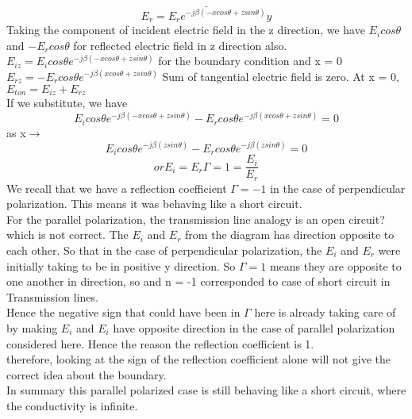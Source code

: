 \begin{equation*}
\bar{E_{r} = E_{r} e^{-j\beta(-xcos\theta + zsin\theta)} \hat{y}}
\end{equation*}
Taking the component of incident electric field in the z direction, we have $E_{i} cos\theta$ and $-E_{r}cos\theta$ for reflected electric field in z direction also.
$E_{iz} = E_{i}cos\theta e^{-j\beta(-xcos\theta + zsin\theta)}$	for the boundary condition and x = 0
$E_{rz} = -E_{r}cos\theta e^{-j\beta(xcos\theta + zsin\theta)}$   Sum of tangential electric field is zero.
At x = 0, $E_{ton} = E_{iz} + E_{rz}$\\
If we substitute, we have\\
\begin{equation*}
E_{i}cos\theta e^{-j\beta(-xcos\theta + zsin\theta)} - E_{r}cos\theta e^{-j\beta(xcos\theta + zsin\theta)} = 0
\end{equation*}
as x$\rightarrow$
\begin{equation*}
E_{i}cos\theta e^{-j\beta(zsin\theta)} - E_{r}cos\theta e^{-j\beta(zsin\theta)} = 0
\end{equation*}
\begin{equation*}
or E_{i} = E_{r}
\Gamma= 1 = \frac{E_{i}}{E_{r}}
\end{equation*}
We recall that we have a reflection coefficient $\Gamma = -1$ in the case of perpendicular polarization. This means it was behaving like a short circuit.\\
For the parallel polarization, the transmission line analogy is an open circuit? which is not correct. The $E_{i}$ and $E_{r}$ from the diagram has direction opposite to each other. So that in the case of perpendicular polarization, the $E_{i}$ and $ E_{r}$  were initially taking to be in positive y direction. So   $\Gamma = 1$ means they are opposite to one another in direction, so and n = -1 corresponded to case of short circuit in Transmission lines.\\
Hence the negative sign that could have been in $\Gamma$ here is already taking care of by making $E_{i}$ and $E_{i}$ have opposite direction in the case of parallel polarization considered here. Hence the reason the reflection coefficient is 1.\\
therefore, looking at the sign of the reflection coefficient alone will not give the correct idea about the boundary.\\ 
In summary this parallel polarized case is still behaving like a short circuit, where the conductivity is infinite.\\ 
